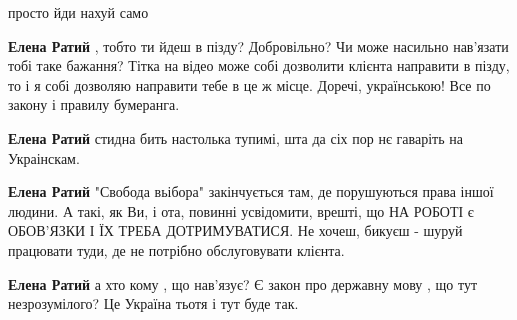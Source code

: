 \begin{itemize}
\begin{itemize}
 
просто йди нахуй само

 
\textbf{Елена Ратий} , тобто ти йдеш в пізду? Добровільно? Чи може насильно нав'язати тобі таке бажання? Тітка на відео може собі дозволити клієнта направити в пізду, то і я собі дозволяю направити тебе в це ж місце. Доречі, українською! Все по закону і правилу бумеранга.

 
\textbf{Елена Ратий} стидна бить настолька тупимі, шта да сіх пор нє гаваріть на Украінскам.

 
\textbf{Елена Ратий} "Свобода вьібора" закінчується там, де порушуються права іншої людини.
А такі, як Ви, і ота, повинні усвідомити, врешті, що НА РОБОТІ є ОБОВ'ЯЗКИ І ЇХ ТРЕБА ДОТРИМУВАТИСЯ. Не хочеш, бикуєш - шуруй працювати туди, де не потрібно обслуговувати клієнта.

 
\textbf{Елена Ратий} а хто кому , що нав'язує? Є закон про державну мову , що тут незрозумілого? Це Україна тьотя і тут буде так.

 

\end{itemize}
\end{itemize}

